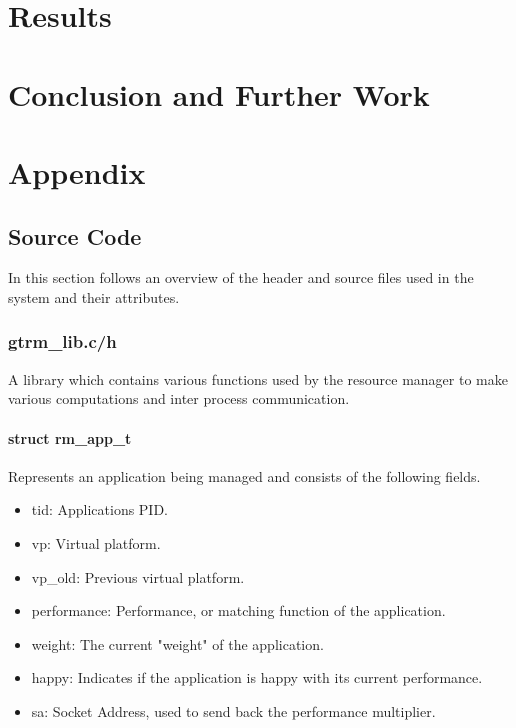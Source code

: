 \documentclass[nobiblatex]{LTHthesis}
\begin{document}
\chapter{Results}
\label{chp:results}

\chapter{Conclusion and Further Work}
\label{chp:conclusion}





\chapter{Appendix}
\section{Source Code}
In this section follows an overview of the header and source files used in the system and their attributes.
\subsection{gtrm\_lib.c/h}
A library which contains various functions used by the resource manager to make various computations and inter process communication.

\subsubsection{struct rm\_app\_t}
Represents an application being managed and consists of the following fields.
\begin{itemize}
\item tid: Applications PID.
\item vp: Virtual platform.
\item vp\_old: Previous virtual platform.
\item performance: Performance, or matching function of the application.
\item weight: The current "weight" of the application.
\item happy: Indicates if the application is happy with its current performance.
\item sa: Socket Address, used to send back the performance multiplier.
\end{itemize}
\end{document}
